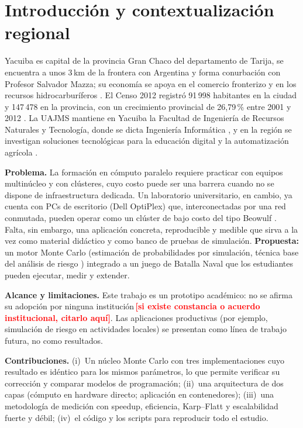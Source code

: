 \documentclass[conference]{IEEEtran}
\newcommand{\TODO}[1]{\textcolor{red}{\textbf{[#1]}}}
\begin{document}
\section{Introducci\'on y contextualizaci\'on regional}
Yacuiba es capital de la provincia Gran Chaco del departamento de Tarija, se encuentra a unos 3\,km de la frontera con Argentina y forma conurbaci\'on con Profesor Salvador Mazza; su econom\'ia se apoya en el comercio fronterizo y en los recursos hidrocarbur\'iferos \cite{bcb2015}. El Censo 2012 registr\'o 91\,998 habitantes en la ciudad \cite{bcb2015} y 147\,478 en la provincia, con un crecimiento provincial de 26,79\,\% entre 2001 y 2012 \cite{ine2014}. La UAJMS mantiene en Yacuiba la Facultad de Ingenier\'ia de Recursos Naturales y Tecnolog\'ia, donde se dicta Ingenier\'ia Inform\'atica \cite{iyarakua2024}, y en la regi\'on se investigan soluciones tecnol\'ogicas para la educaci\'on digital y la automatizaci\'on agr\'icola \cite{choque}.

\textbf{Problema.} La formaci\'on en c\'omputo paralelo requiere practicar con equipos multin\'ucleo y con cl\'usteres, cuyo costo puede ser una barrera cuando no se dispone de infraestructura dedicada. Un laboratorio universitario, en cambio, ya cuenta con PCs de escritorio (Dell OptiPlex) que, interconectadas por una red conmutada, pueden operar como un cl\'uster de bajo costo del tipo Beowulf \cite{sterling1995}. Falta, sin embargo, una aplicaci\'on concreta, reproducible y medible que sirva a la vez como material did\'actico y como banco de pruebas de simulaci\'on. \textbf{Propuesta:} un motor Monte Carlo (estimaci\'on de probabilidades por simulaci\'on, t\'ecnica base del an\'alisis de riesgo \cite{metropolis1949}) integrado a un juego de Batalla Naval que los estudiantes pueden ejecutar, medir y extender.

\textbf{Alcance y limitaciones.} Este trabajo es un prototipo acad\'emico: no se afirma su adopci\'on por ninguna instituci\'on\,\TODO{si existe constancia o acuerdo institucional, citarlo aqu\'i}. Las aplicaciones productivas (por ejemplo, simulaci\'on de riesgo en actividades locales) se presentan como l\'inea de trabajo futura, no como resultados.

\textbf{Contribuciones.} (i)~Un n\'ucleo Monte Carlo con tres implementaciones cuyo resultado es id\'entico para los mismos par\'ametros, lo que permite verificar su correcci\'on y comparar modelos de programaci\'on; (ii)~una arquitectura de dos capas (c\'omputo en hardware directo; aplicaci\'on en contenedores); (iii)~una metodolog\'ia de medici\'on con speedup, eficiencia, Karp--Flatt y escalabilidad fuerte y d\'ebil; (iv)~el c\'odigo y los scripts para reproducir todo el estudio.
\end{document}

